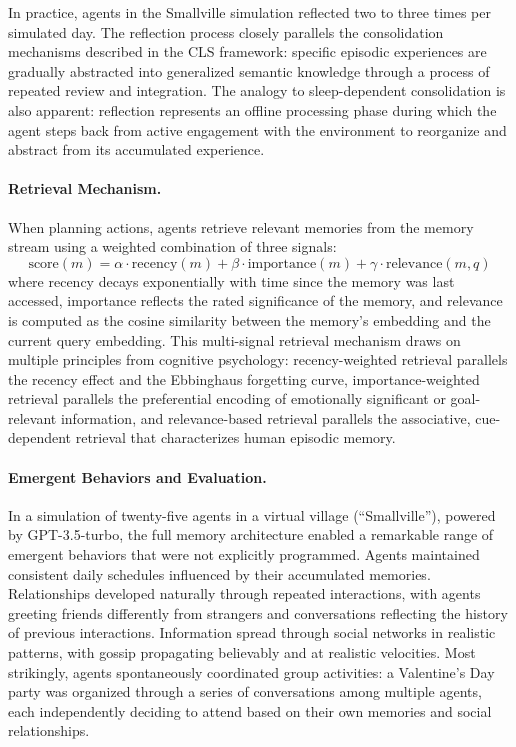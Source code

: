\documentclass[11pt,letterpaper]{article}
\begin{document}
In practice, agents in the Smallville simulation reflected two to three times per simulated day. The reflection process closely parallels the consolidation mechanisms described in the CLS framework: specific episodic experiences are gradually abstracted into generalized semantic knowledge through a process of repeated review and integration. The analogy to sleep-dependent consolidation is also apparent: reflection represents an offline processing phase during which the agent steps back from active engagement with the environment to reorganize and abstract from its accumulated experience.

\paragraph{Retrieval Mechanism.} When planning actions, agents retrieve relevant memories from the memory stream using a weighted combination of three signals:
\begin{equation}
\text{score}(m) = \alpha \cdot \text{recency}(m) + \beta \cdot \text{importance}(m) + \gamma \cdot \text{relevance}(m, q)
\end{equation}
where recency decays exponentially with time since the memory was last accessed, importance reflects the rated significance of the memory, and relevance is computed as the cosine similarity between the memory's embedding and the current query embedding. This multi-signal retrieval mechanism draws on multiple principles from cognitive psychology: recency-weighted retrieval parallels the recency effect and the Ebbinghaus forgetting curve, importance-weighted retrieval parallels the preferential encoding of emotionally significant or goal-relevant information, and relevance-based retrieval parallels the associative, cue-dependent retrieval that characterizes human episodic memory.

\paragraph{Emergent Behaviors and Evaluation.} In a simulation of twenty-five agents in a virtual village (``Smallville''), powered by GPT-3.5-turbo, the full memory architecture enabled a remarkable range of emergent behaviors that were not explicitly programmed. Agents maintained consistent daily schedules influenced by their accumulated memories. Relationships developed naturally through repeated interactions, with agents greeting friends differently from strangers and conversations reflecting the history of previous interactions. Information spread through social networks in realistic patterns, with gossip propagating believably and at realistic velocities. Most strikingly, agents spontaneously coordinated group activities: a Valentine's Day party was organized through a series of conversations among multiple agents, each independently deciding to attend based on their own memories and social relationships.
\end{document}
